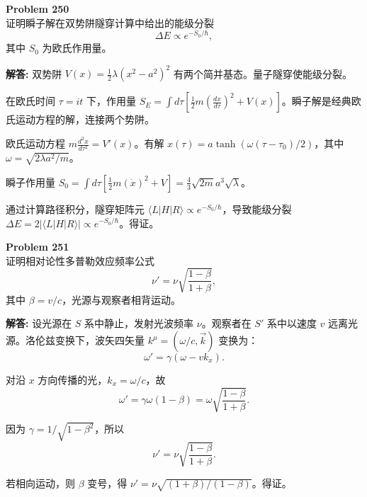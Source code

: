 \documentclass[12pt, a4paper, oneside]{ctexart}
\newenvironment{solution}{\par\noindent\textbf{解答:}\quad}{\par}
\begin{document}
\begin{mdframed}[backgroundcolor=gray!10, linewidth=0pt]
    \textbf{Problem 250} \\
    证明瞬子解在双势阱隧穿计算中给出的能级分裂
    \[
    \Delta E \propto e^{-S_0 / \hbar},
    \]
    其中 $S_0$ 为欧氏作用量。
\end{mdframed}
\begin{solution}
    双势阱 $V(x) = \frac{1}{2} \lambda (x^2 - a^2)^2$ 有两个简并基态。量子隧穿使能级分裂。
    
    在欧氏时间 $\tau = it$ 下，作用量 $S_E = \int d\tau \left[ \frac{1}{2} m (\frac{dx}{d\tau})^2 + V(x) \right]$。瞬子解是经典欧氏运动方程的解，连接两个势阱。
    
    欧氏运动方程 $m \frac{d^2 x}{d\tau^2} = V'(x)$。有解 $x(\tau) = a \tanh(\omega (\tau - \tau_0)/2)$，其中 $\omega = \sqrt{2\lambda a^2 / m}$。
    
    瞬子作用量 $S_0 = \int d\tau \left[ \frac{1}{2} m (\dot{x})^2 + V \right] = \frac{4}{3} \sqrt{2m} a^3 \sqrt{\lambda}$。
    
    通过计算路径积分，隧穿矩阵元 $\langle L | H | R \rangle \propto e^{-S_0/\hbar}$，导致能级分裂 $\Delta E = 2 |\langle L | H | R \rangle| \propto e^{-S_0/\hbar}$。得证。
\end{solution}

\begin{mdframed}[backgroundcolor=gray!10, linewidth=0pt]
    \textbf{Problem 251} \\
    证明相对论性多普勒效应频率公式
    \[
    \nu' = \nu \sqrt{ \frac{1 - \beta}{1 + \beta} },
    \]
    其中 $\beta = v/c$，光源与观察者相背运动。
\end{mdframed}
\begin{solution}
    设光源在 $S$ 系中静止，发射光波频率 $\nu$。观察者在 $S'$ 系中以速度 $v$ 远离光源。洛伦兹变换下，波矢四矢量 $k^\mu = (\omega/c, \vec{k})$ 变换为：
    \[
    \omega' = \gamma (\omega - v k_x).
    \]
    
    对沿 $x$ 方向传播的光，$k_x = \omega/c$，故
    \[
    \omega' = \gamma \omega (1 - \beta) = \omega \sqrt{ \frac{1 - \beta}{1 + \beta} }.
    \]
    
    因为 $\gamma = 1/\sqrt{1-\beta^2}$，所以
    \[
    \nu' = \nu \sqrt{ \frac{1 - \beta}{1 + \beta} }.
    \]
    
    若相向运动，则 $\beta$ 变号，得 $\nu' = \nu \sqrt{ (1+\beta)/(1-\beta) }$。得证。
\end{solution}
\end{document}
